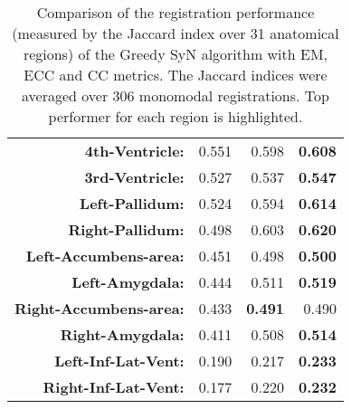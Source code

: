 \begin{table}[htbp]
{\begin{tabular}{rrrr}
    \textbf{4th-Ventricle:} & 0.551 & 0.598 & \textbf{0.608} \\
    \textbf{3rd-Ventricle:} & 0.527 & 0.537 & \textbf{0.547} \\
    \textbf{Left-Pallidum:} & 0.524 & 0.594 & \textbf{0.614} \\
    \textbf{Right-Pallidum:} & 0.498 & 0.603 & \textbf{0.620} \\
    \textbf{Left-Accumbens-area:} & 0.451 & 0.498 & \textbf{0.500} \\
    \textbf{Left-Amygdala:} & 0.444 & 0.511 & \textbf{0.519} \\
    \textbf{Right-Accumbens-area:} & 0.433 & \textbf{0.491} & 0.490 \\
    \textbf{Right-Amygdala:} & 0.411 & 0.508 & \textbf{0.514} \\
    \textbf{Left-Inf-Lat-Vent:} & 0.190 & 0.217 & \textbf{0.233} \\
    \textbf{Right-Inf-Lat-Vent:} & 0.177 & 0.220 & \textbf{0.232} \\
    \bottomrule
    \end{tabular}}%
    \caption{Comparison of the registration performance (measured by the Jaccard index over 31 anatomical regions) of the Greedy SyN algorithm with EM, ECC and CC metrics. The Jaccard
indices were averaged over 306 monomodal registrations. Top performer for each region is highlighted.}
  \label{tab:monomodal_results_seg}%
\end{table}%
